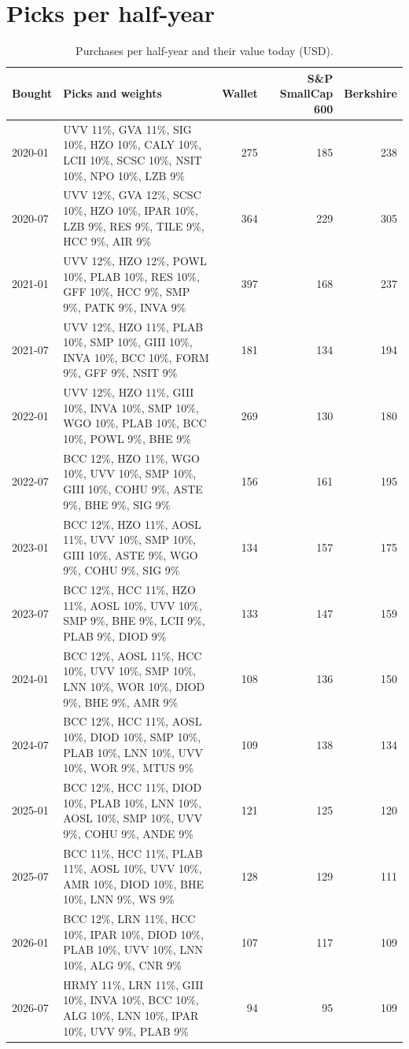\documentclass[11pt,a4paper]{article}
\begin{document}
\section{Picks per half-year}
\begin{table}[H]
\centering
\small
\caption{Purchases per half-year and their value today (USD).}\label{tab:picks}
\begin{tabular}{l p{9.2cm} r r r }
\hline
Bought & Picks and weights & Wallet & S\&P SmallCap 600 & Berkshire \\
\hline
2020-01 & UVV 11\%, GVA 11\%, SIG 10\%, HZO 10\%, CALY 10\%, LCII 10\%, SCSC 10\%, NSIT 10\%, NPO 10\%, LZB 9\% & 275 & 185 & 238 \\
2020-07 & UVV 12\%, GVA 12\%, SCSC 10\%, HZO 10\%, IPAR 10\%, LZB 9\%, RES 9\%, TILE 9\%, HCC 9\%, AIR 9\% & 364 & 229 & 305 \\
2021-01 & UVV 12\%, HZO 12\%, POWL 10\%, PLAB 10\%, RES 10\%, GFF 10\%, HCC 9\%, SMP 9\%, PATK 9\%, INVA 9\% & 397 & 168 & 237 \\
2021-07 & UVV 12\%, HZO 11\%, PLAB 10\%, SMP 10\%, GIII 10\%, INVA 10\%, BCC 10\%, FORM 9\%, GFF 9\%, NSIT 9\% & 181 & 134 & 194 \\
2022-01 & UVV 12\%, HZO 11\%, GIII 10\%, INVA 10\%, SMP 10\%, WGO 10\%, PLAB 10\%, BCC 10\%, POWL 9\%, BHE 9\% & 269 & 130 & 180 \\
2022-07 & BCC 12\%, HZO 11\%, WGO 10\%, UVV 10\%, SMP 10\%, GIII 10\%, COHU 9\%, ASTE 9\%, BHE 9\%, SIG 9\% & 156 & 161 & 195 \\
2023-01 & BCC 12\%, HZO 11\%, AOSL 11\%, UVV 10\%, SMP 10\%, GIII 10\%, ASTE 9\%, WGO 9\%, COHU 9\%, SIG 9\% & 134 & 157 & 175 \\
2023-07 & BCC 12\%, HCC 11\%, HZO 11\%, AOSL 10\%, UVV 10\%, SMP 9\%, BHE 9\%, LCII 9\%, PLAB 9\%, DIOD 9\% & 133 & 147 & 159 \\
2024-01 & BCC 12\%, AOSL 11\%, HCC 10\%, UVV 10\%, SMP 10\%, LNN 10\%, WOR 10\%, DIOD 9\%, BHE 9\%, AMR 9\% & 108 & 136 & 150 \\
2024-07 & BCC 12\%, HCC 11\%, AOSL 10\%, DIOD 10\%, SMP 10\%, PLAB 10\%, LNN 10\%, UVV 10\%, WOR 9\%, MTUS 9\% & 109 & 138 & 134 \\
2025-01 & BCC 12\%, HCC 11\%, DIOD 10\%, PLAB 10\%, LNN 10\%, AOSL 10\%, SMP 10\%, UVV 9\%, COHU 9\%, ANDE 9\% & 121 & 125 & 120 \\
2025-07 & BCC 11\%, HCC 11\%, PLAB 11\%, AOSL 10\%, UVV 10\%, AMR 10\%, DIOD 10\%, BHE 10\%, LNN 9\%, WS 9\% & 128 & 129 & 111 \\
2026-01 & BCC 12\%, LRN 11\%, HCC 10\%, IPAR 10\%, DIOD 10\%, PLAB 10\%, UVV 10\%, LNN 10\%, ALG 9\%, CNR 9\% & 107 & 117 & 109 \\
2026-07 & HRMY 11\%, LRN 11\%, GIII 10\%, INVA 10\%, BCC 10\%, ALG 10\%, LNN 10\%, IPAR 10\%, UVV 9\%, PLAB 9\% & 94 & 95 & 109 \\
\hline
\end{tabular}
\end{table}
\end{document}
